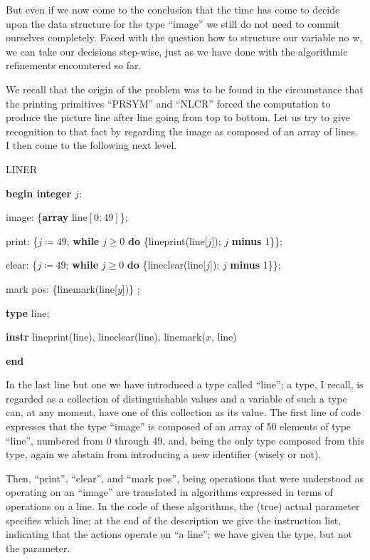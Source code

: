 But even if we now come to the conclusion that the time has come to decide upon the data structure for the type ``image'' we still do not need to commit ourselves completely. Faced with the question how to structure our variable no w, we can take our decisions step-wise, just as we have done with the algorithmic refinements encountered so far.

We recall that the origin of the problem was to be found in the circumstance that the printing primitives ``PRSYM'' and ``NLCR'' forced the computation to produce the picture line after line going from top to bottom. Let us try to give recognition to that fact by regarding the image as composed of an array of lines. I then come to the following next level.

LINER

\textbf{begin integer} $j$;

\quad image: \{\textbf{array} line$[0: 49]$\};

\quad print: \{$j \coloneq 49$; \textbf{while} $j \geqslant 0$ \textbf{do} \{lineprint(line[$j$]); $j$ \textbf{minus} 1\}\};

\quad clear: \{$j \coloneq 49$; \textbf{while} $j \geqslant 0$ \textbf{do} \{lineclear(line[$j$]); $j$ \textbf{minus} 1\}\};

\quad mark pos: \{linemark(line[$y$])\} ;

\quad \textbf{type} line;

\quad \textbf{instr} lineprint(line), lineclear(line), linemark($x$, line)

\textbf{end}

In the last line but one we have introduced a type called ``line''; a type, I recall, is regarded as a collection of distinguishable values and a variable of such a type can, at any moment, have one of this collection as its value. The first line of code expresses that the type ``image'' is composed of an array of 50 elements of type ``line'', numbered from 0 through 49, and, being the only type composed from this type, again we abstain from introducing a new identifier (wisely or not).

Then, ``print'', ``clear'', and ``mark pos'', being operations that were understood as operating on an ``image'' are translated in algorithms expressed in terms of operations on a line. In the code of these algorithms, the (true) actual parameter specifies which line; at the end of the description we give the instruction list, indicating that the actions operate on ``a line''; we have given the type, but not the parameter.

